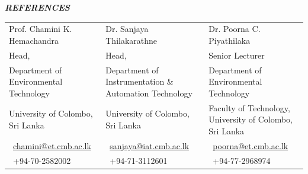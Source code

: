 \documentclass[10pt]{article}
\newcommand{\emailicon}{\faEnvelope}
\newcommand{\phoneicon}{\faPhone}}
\newcommand{\phoneicon}{Tel:}}
\newcommand{\cvsection}[1]{%
  \vspace{8pt}%
  \begin{tcolorbox}[colback=headergray,colframe=headergray,arc=9pt,
      boxrule=0pt,left=10pt,right=10pt,top=3pt,bottom=3pt]
    \large\itshape\bfseries\MakeUppercase{#1}%
  \end{tcolorbox}%
  \vspace{2pt}%
}
\begin{document}
\cvsection{References}
\vspace{2pt}
{\small
\begin{tabularx}{\textwidth}{@{}>{\raggedright\arraybackslash}X >{\raggedright\arraybackslash}X >{\raggedright\arraybackslash}X@{}}
  Prof. Chamini K. Hemachandra &
  Dr. Sanjaya Thilakarathne &
  Dr. Poorna C. Piyathilaka \\
  Head, &
  Head, &
  Senior Lecturer \\
  Department of Environmental Technology &
  Department of Instrumentation \& Automation Technology &
  Department of Environmental Technology \\
  University of Colombo, Sri Lanka &
  University of Colombo, Sri Lanka &
  Faculty of Technology, University of Colombo, Sri Lanka \\[3pt]
  \emailicon\ \href{mailto:chamini@et.cmb.ac.lk}{chamini@et.cmb.ac.lk} &
  \emailicon\ \href{mailto:sanjaya@iat.cmb.ac.lk}{sanjaya@iat.cmb.ac.lk} &
  \emailicon\ \href{mailto:poorna@et.cmb.ac.lk}{poorna@et.cmb.ac.lk} \\
  \phoneicon\ +94-70-2582002 &
  \phoneicon\ +94-71-3112601 &
  \phoneicon\ +94-77-2968974 \\
\end{tabularx}
}
\end{document}
